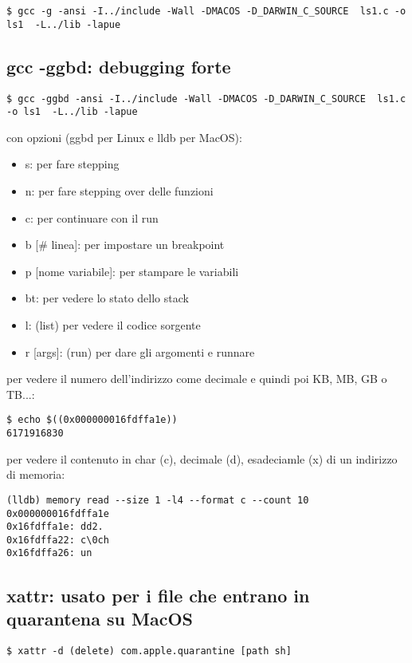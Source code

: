 \begin{lstlisting}
$ gcc -g -ansi -I../include -Wall -DMACOS -D_DARWIN_C_SOURCE  ls1.c -o ls1  -L../lib -lapue
\end{lstlisting}


\subsection{gcc -ggbd: debugging forte}

\begin{lstlisting}
$ gcc -ggbd -ansi -I../include -Wall -DMACOS -D_DARWIN_C_SOURCE  ls1.c -o ls1  -L../lib -lapue
\end{lstlisting}

con opzioni (ggbd per Linux e lldb per MacOS):
\begin{itemize}
    \item s: per fare stepping
    \item n: per fare stepping over delle funzioni
    \item c: per continuare con il run
    \item b [\# linea]: per impostare un breakpoint
    \item p [nome variabile]: per stampare le variabili
    \item bt: per vedere lo stato dello stack
    \item l: (list) per vedere il codice sorgente
    \item r [args]: (run) per dare gli argomenti e runnare
\end{itemize}

per vedere il numero dell'indirizzo come decimale e quindi poi KB, MB, GB o TB...:
\begin{lstlisting}
$ echo $((0x000000016fdffa1e))
6171916830
\end{lstlisting}

per vedere il contenuto in char (c), decimale (d), esadeciamle (x) di un indirizzo di memoria:
\begin{lstlisting}
(lldb) memory read --size 1 -l4 --format c --count 10 0x000000016fdffa1e
0x16fdffa1e: dd2.
0x16fdffa22: c\0ch
0x16fdffa26: un
\end{lstlisting}


\subsection{xattr: usato per i file che entrano in quarantena su MacOS}

\begin{lstlisting}
$ xattr -d (delete) com.apple.quarantine [path sh]
\end{lstlisting}


